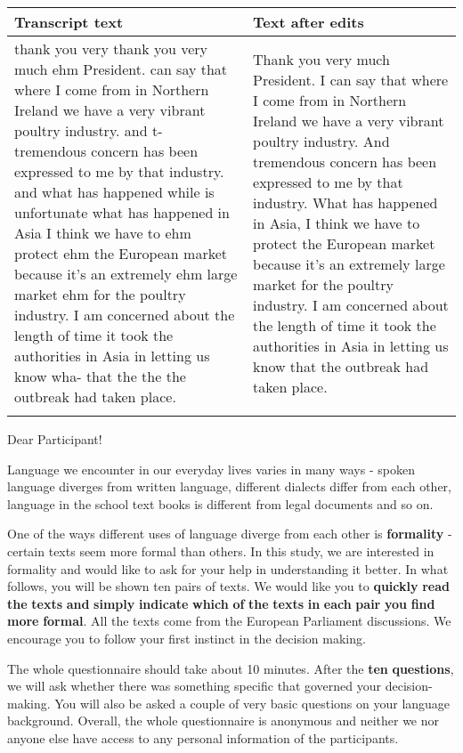 \documentclass[output=paper]{langscibook}
\begin{document}
\begin{tabularx}{\textwidth}{XX}

\lsptoprule

Transcript text & Text after edits\\
\midrule
thank you very thank you very much ehm President. can say that where I come from in Northern Ireland we have a very vibrant poultry industry. and t- tremendous concern has been expressed to me by that industry. and what has happened while is unfortunate what has happened in Asia I think we have to ehm protect ehm the European market because it's an extremely ehm large market ehm for the poultry industry. I am concerned about the length of time it took the authorities in Asia in letting us know wha- that the the the outbreak had taken place. & Thank you very much President. I can say that where I come from in Northern Ireland we have a very vibrant poultry industry. And tremendous concern has been expressed to me by that industry. What has happened in Asia, I think we have to protect the European market because it's an extremely large market for the poultry industry. I am concerned about the length of time it took the authorities in Asia in letting us know that the outbreak had taken place.\\
\lspbottomrule
\end{tabularx}


\label{ap:ivaska:2}


\noindent
Dear Participant!

\noindent
Language we encounter in our everyday lives varies in many ways - spoken language diverges from written language, different dialects differ from each other, language in the school text books is different from legal documents and so on.

One of the ways different uses of language diverge from each other is \textbf{formality} - certain texts seem more formal than others. In this study, we are interested in formality and would like to ask for your help in understanding it better. In what follows, you will be shown ten pairs of texts. We would like you to \textbf{quickly} \textbf{read} \textbf{the} \textbf{texts} \textbf{and} \textbf{simply} \textbf{indicate} \textbf{which} \textbf{of} \textbf{the} \textbf{texts} \textbf{in} \textbf{each} \textbf{pair} \textbf{you} \textbf{find} \textbf{more} \textbf{formal}. All the texts come from the European Parliament discussions. We encourage you to follow your first instinct in the decision making.

The whole questionnaire should take about 10 minutes. After the \textbf{ten} \textbf{questions}, we will ask whether there was something specific that governed your decision-making. You will also be asked a couple of very basic questions on your language background. Overall, the whole questionnaire is anonymous and neither we nor anyone else have access to any personal information of the participants.

\sloppy\printbibliography[heading=subbibliography,notkeyword=this]
\end{document}
